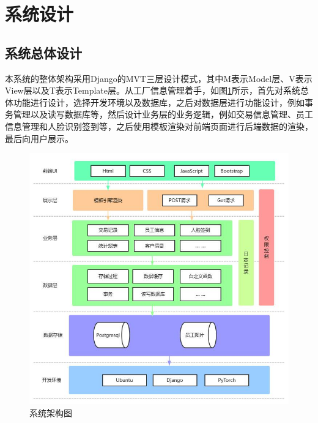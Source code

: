 \section{系统设计}

\subsection{系统总体设计}

本系统的整体架构采用Django的MVT三层设计模式，其中M表示Model层、V表示View层以及T表示Template层。从工厂信息管理着手，如图\ref{fig:sysarc}所示，首先对系统总体功能进行设计，选择开发环境以及数据库，之后对数据层进行功能设计，例如事务管理以及读写数据库等，然后设计业务层的业务逻辑，例如交易信息管理、员工信息管理和人脸识别签到等，之后使用模板渲染对前端页面进行后端数据的渲染，最后向用户展示。

\begin{figure}[H]
    \centering
    \includegraphics[width=.75\textwidth]{figures/4total.jpg}
    \caption{系统架构图}
    \label{fig:sysarc}
\end{figure}

